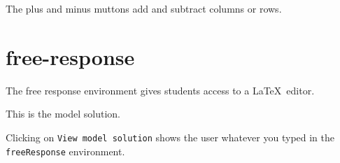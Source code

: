 \documentclass{ximera}
\begin{document}
\begin{remark}
The plus and minus muttons add and subtract columns or rows.  
\end{remark}

\section{free-response}

The free response environment gives students access to a \LaTeX\ editor. 

\begin{freeResponse}
	This is the model solution.
\end{freeResponse}

\begin{remark}
Clicking on \verb!View model solution! shows the user
whatever you typed in the  \verb!freeResponse! environment.
\end{remark}
	
\end{document}
